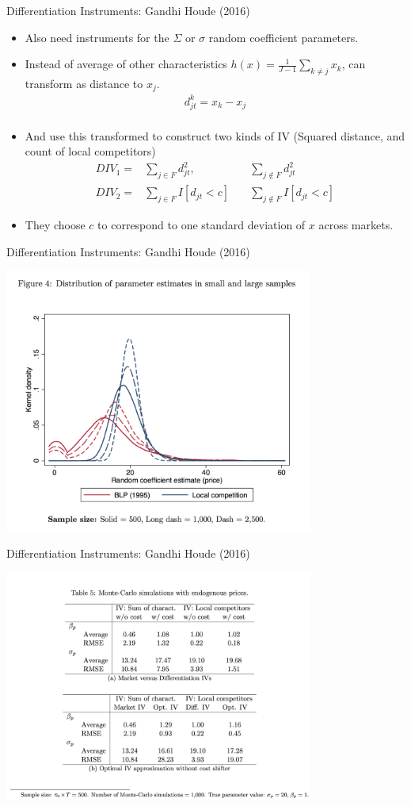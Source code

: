 \documentclass[xcolor=pdftex,dvipsnames,table,mathserif]{beamer}
\begin{document}
\begin{frame}{Differentiation Instruments: Gandhi Houde (2016)}
\begin{itemize}
\item Also need instruments for the $\Sigma$ or $\sigma$ random coefficient parameters.
\item Instead of average of other characteristics $h(x) = \frac{1}{J-1} \sum_{k \neq j} x_k$, can transform as distance to $x_j$.
\begin{eqnarray*}
d_{jt} ^k=  x_k - x_j  \\
\end{eqnarray*}
\item And use this transformed to construct two kinds of IV (Squared distance, and count of local competitors)
\begin{eqnarray*}
DIV_1 =& \sum_{j \in F}  d_{jt}^2,  \quad &\sum_{j \notin F}  d_{jt}^2 \\
DIV_2 =& \sum_{j \in F}  I[d_{jt} < c]   \quad &\sum_{j \notin F}   I[d_{jt} < c]
\end{eqnarray*}
\item They choose $c$ to correspond to one standard deviation of $x$ across markets.
\end{itemize}
\end{frame}


\begin{frame}{Differentiation Instruments: Gandhi Houde (2016)}
\begin{center}
\includegraphics[width=4in]{resources/d_iv1.png}
\end{center}
\end{frame}


\begin{frame}{Differentiation Instruments: Gandhi Houde (2016)}
\begin{center}
\includegraphics[width=4in]{resources/d_iv2.png}
\end{center}
\end{frame}
\end{document}
